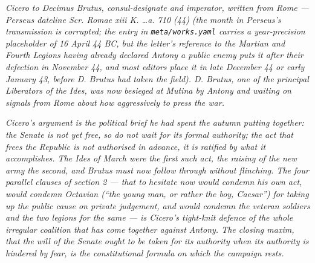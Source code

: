 
\textit{Cicero to Decimus Brutus, consul-designate and \textit{imperator}, written from Rome --- Perseus dateline \textit{Scr. Romae xiii K. \dots a. 710 (44)} (the month in Perseus's transmission is corrupted; the entry in \texttt{meta/works.yaml} carries a year-precision placeholder of 16 April 44 BC, but the letter's reference to the Martian and Fourth Legions having already declared Antony a public enemy puts it after their defection in November 44, and most editors place it in late December 44 or early January 43, before D. Brutus had taken the field). D. Brutus, one of the principal Liberators of the Ides, was now besieged at Mutina by Antony and waiting on signals from Rome about how aggressively to press the war.}

\textit{Cicero's argument is the political brief he had spent the autumn putting together: the Senate is not yet free, so do not wait for its formal authority; the act that frees the Republic is not authorised in advance, it is ratified by what it accomplishes. The Ides of March were the first such act, the raising of the new army the second, and Brutus must now follow through without flinching. The four parallel clauses of section 2 --- that to hesitate now would condemn his own act, would condemn Octavian (``the young man, or rather the boy, Caesar'') for taking up the public cause on private judgement, and would condemn the veteran soldiers and the two legions for the same --- is Cicero's tight-knit defence of the whole irregular coalition that has come together against Antony. The closing maxim, that the will of the Senate ought to be taken for its authority when its authority is hindered by fear, is the constitutional formula on which the campaign rests.}

